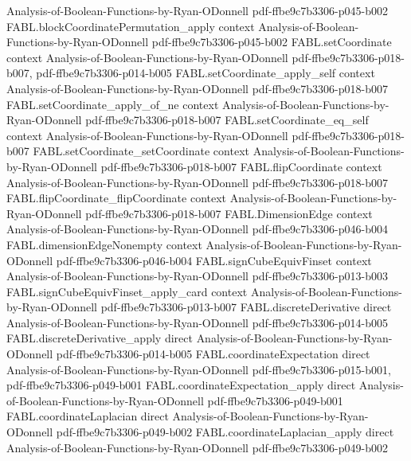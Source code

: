 \begin{theorem}
  {Analysis-of-Boolean-Functions-by-Ryan-ODonnell}
  {pdf-ffbe9c7b3306-p045-b002}
\proofstep
  {FABL.blockCoordinatePermutation_apply}
  {context}
  {Analysis-of-Boolean-Functions-by-Ryan-ODonnell}
  {pdf-ffbe9c7b3306-p045-b002}
\proofstep
  {FABL.setCoordinate}
  {context}
  {Analysis-of-Boolean-Functions-by-Ryan-ODonnell}
  {pdf-ffbe9c7b3306-p018-b007,
    pdf-ffbe9c7b3306-p014-b005}
\proofstep
  {FABL.setCoordinate_apply_self}
  {context}
  {Analysis-of-Boolean-Functions-by-Ryan-ODonnell}
  {pdf-ffbe9c7b3306-p018-b007}
\proofstep
  {FABL.setCoordinate_apply_of_ne}
  {context}
  {Analysis-of-Boolean-Functions-by-Ryan-ODonnell}
  {pdf-ffbe9c7b3306-p018-b007}
\proofstep
  {FABL.setCoordinate_eq_self}
  {context}
  {Analysis-of-Boolean-Functions-by-Ryan-ODonnell}
  {pdf-ffbe9c7b3306-p018-b007}
\proofstep
  {FABL.setCoordinate_setCoordinate}
  {context}
  {Analysis-of-Boolean-Functions-by-Ryan-ODonnell}
  {pdf-ffbe9c7b3306-p018-b007}
\proofstep
  {FABL.flipCoordinate}
  {context}
  {Analysis-of-Boolean-Functions-by-Ryan-ODonnell}
  {pdf-ffbe9c7b3306-p018-b007}
\proofstep
  {FABL.flipCoordinate_flipCoordinate}
  {context}
  {Analysis-of-Boolean-Functions-by-Ryan-ODonnell}
  {pdf-ffbe9c7b3306-p018-b007}
\proofstep
  {FABL.DimensionEdge}
  {context}
  {Analysis-of-Boolean-Functions-by-Ryan-ODonnell}
  {pdf-ffbe9c7b3306-p046-b004}
\proofstep
  {FABL.dimensionEdgeNonempty}
  {context}
  {Analysis-of-Boolean-Functions-by-Ryan-ODonnell}
  {pdf-ffbe9c7b3306-p046-b004}
\proofstep
  {FABL.signCubeEquivFinset}
  {context}
  {Analysis-of-Boolean-Functions-by-Ryan-ODonnell}
  {pdf-ffbe9c7b3306-p013-b003}
\proofstep
  {FABL.signCubeEquivFinset_apply_card}
  {context}
  {Analysis-of-Boolean-Functions-by-Ryan-ODonnell}
  {pdf-ffbe9c7b3306-p013-b007}
\proofstep
  {FABL.discreteDerivative}
  {direct}
  {Analysis-of-Boolean-Functions-by-Ryan-ODonnell}
  {pdf-ffbe9c7b3306-p014-b005}
\proofstep
  {FABL.discreteDerivative_apply}
  {direct}
  {Analysis-of-Boolean-Functions-by-Ryan-ODonnell}
  {pdf-ffbe9c7b3306-p014-b005}
\proofstep
  {FABL.coordinateExpectation}
  {direct}
  {Analysis-of-Boolean-Functions-by-Ryan-ODonnell}
  {pdf-ffbe9c7b3306-p015-b001,
    pdf-ffbe9c7b3306-p049-b001}
\proofstep
  {FABL.coordinateExpectation_apply}
  {direct}
  {Analysis-of-Boolean-Functions-by-Ryan-ODonnell}
  {pdf-ffbe9c7b3306-p049-b001}
\proofstep
  {FABL.coordinateLaplacian}
  {direct}
  {Analysis-of-Boolean-Functions-by-Ryan-ODonnell}
  {pdf-ffbe9c7b3306-p049-b002}
\proofstep
  {FABL.coordinateLaplacian_apply}
  {direct}
  {Analysis-of-Boolean-Functions-by-Ryan-ODonnell}
  {pdf-ffbe9c7b3306-p049-b002}

\end{theorem}
